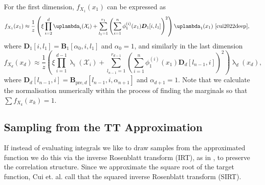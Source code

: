 For the first dimension, $f_{X_1}(x_1)$ can be expressed as
\begin{equation}
	f_{X_1}(x_1)  \approx \frac{1}{z} \left(\xi \prod_{i=2}^{d} \uplambda_i(\mathcal{X}_i) + \sum_{l_1=1}^{r_1} \left(\sum_{i=1}^{n} \phi^{(i)}_1(x_1) \bm{D}_1[i, l_1] \right)^2 \right) \uplambda_1(x_1)\, \,  \text{\cite[Eq. 30]{cui2022deep}},
	\label{eq:firstMarg}
\end{equation}
where $\bm{D}_1[i, l_1] = \bm{B}_1[\alpha_0, i, l_1]$ and $\alpha_0 = 1$,
and similarly in the last dimension
\begin{equation}
	f_{X_d}(x_d)  \approx \frac{1}{z} \left(\xi \prod_{i=1}^{d-1} \uplambda_i(\mathcal{X}_i) + \sum_{l_{n-1}=1}^{r_{d-1}} \left(\sum_{i=1}^{n} \phi^{(i)}_1(x_1) \bm{D}_d[l_{n-1},i] \right)^2 \right) \uplambda_d(x_d),
\end{equation}
where $\bm{D}_d[l_{n-1},i] = \bm{B}_{\text{pre},d}[l_{n-1}, i, \alpha_{n+1}]$ and $\alpha_{d+1} = 1$.
Note that we calculate the normalisation numerically within the process of finding the marginals so that $\sum f_{X_k}(x_k) = 1$.

\subsection{Sampling from the TT Approximation}
If instead of evaluating integrals we like to draw samples from the approximated function we do this via the inverse Rosenblatt transform (IRT), as in \cite{dolgov2020approximation}, to preserve the correlation structure.
Since we approximate the square root of the target function, Cui et. al. \cite{cui2022deep} call that the squared inverse Rosenblatt transform (SIRT).

